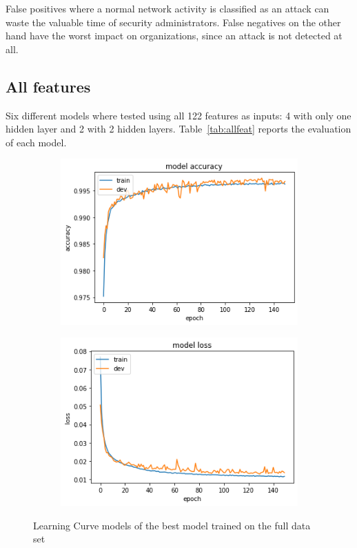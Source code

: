 False positives where a normal network activity is classified as an attack can waste the valuable time of security administrators. False negatives on the other hand have the worst impact on organizations, since an attack is not detected at all.

\subsection{All features}

Six different models where tested using all 122 features as inputs: 4 with only one hidden layer and 2 with 2 hidden layers. Table~\ref{tab:allfeat} reports the evaluation of each model.

\begin{figure}[h]
\center
  \begin{subfigure}[b]{0.6\columnwidth}
    \includegraphics[width=\linewidth]{img/learn1.png}
  \end{subfigure}
  \hfill %
  \begin{subfigure}[b]{0.6\columnwidth}
    \includegraphics[width=\linewidth]{img/learn2.png}

  \end{subfigure}

      \caption{Learning Curve models of the best model trained on the full data set}
\end{figure}

